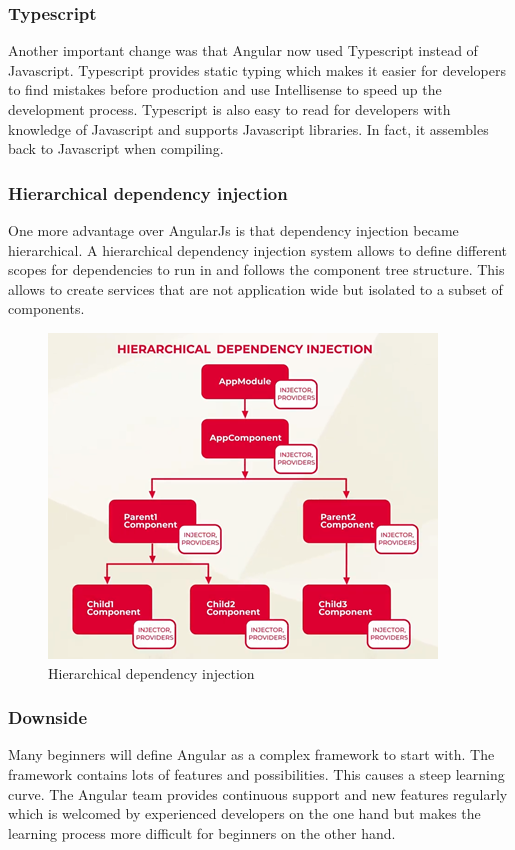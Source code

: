 \subsubsection{Typescript}
Another important change was that Angular now used Typescript instead of Javascript. Typescript provides static typing which makes it easier for developers to find mistakes before production and use Intellisense to speed up the development process. Typescript is also easy to read for developers with knowledge of Javascript and supports Javascript libraries. In fact, it assembles back to Javascript when compiling.
\autocite{Typescriptlang}

\subsubsection{Hierarchical dependency injection}
One more advantage over AngularJs is that dependency injection became hierarchical. A hierarchical dependency injection system allows to define different scopes for dependencies to run in and follows the component tree structure. This allows to create services that are not application wide but isolated to a subset of components.
\autocite{Rylan}
\begin{figure}[h!]
    \caption{Hierarchical dependency injection}
    \centering
    \includegraphics[width=\textwidth]{img/hieradi.png} 
\end{figure}

\subsubsection{Downside}
Many beginners will define Angular as a complex framework to start with. The framework contains lots of features and possibilities. This causes a steep learning curve. The Angular team provides continuous support and new features regularly which is welcomed by experienced developers on the one hand but makes the learning process more difficult for beginners on the other hand.
\autocite{AltexSoft}


